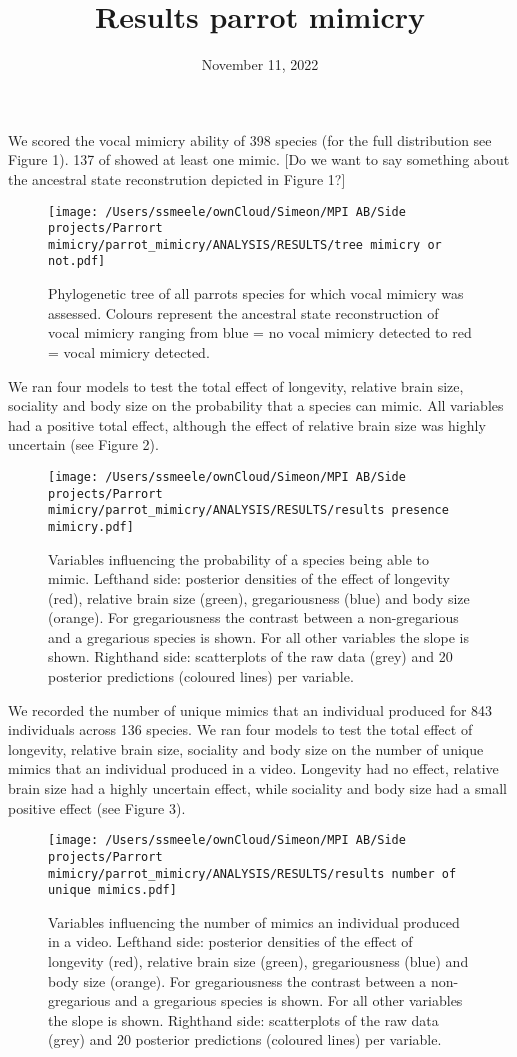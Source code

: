 \documentclass[
  11pt,
]{article}
\title{Results parrot mimicry}
\author{}
\date{\vspace{-2.5em}November 11, 2022}
\begin{document}
\maketitle

We scored the vocal mimicry ability of 398 species (for the full
distribution see Figure 1). 137 of showed at least one mimic. {[}Do we
want to say something about the ancestral state reconstrution depicted
in Figure 1?{]}

\begin{figure}
\centering
\texttt{[image: /Users/ssmeele/ownCloud/Simeon/MPI AB/Side projects/Parrort mimicry/parrot\_mimicry/ANALYSIS/RESULTS/tree mimicry or not.pdf]}
\caption{Phylogenetic tree of all parrots species for which vocal
mimicry was assessed. Colours represent the ancestral state
reconstruction of vocal mimicry ranging from blue = no vocal mimicry
detected to red = vocal mimicry detected.}
\end{figure}

We ran four models to test the total effect of longevity, relative brain
size, sociality and body size on the probability that a species can
mimic. All variables had a positive total effect, although the effect of
relative brain size was highly uncertain (see Figure 2).

\begin{figure}
\centering
\texttt{[image: /Users/ssmeele/ownCloud/Simeon/MPI AB/Side projects/Parrort mimicry/parrot\_mimicry/ANALYSIS/RESULTS/results presence mimicry.pdf]}
\caption{Variables influencing the probability of a species being able
to mimic. Lefthand side: posterior densities of the effect of longevity
(red), relative brain size (green), gregariousness (blue) and body size
(orange). For gregariousness the contrast between a non-gregarious and a
gregarious species is shown. For all other variables the slope is shown.
Righthand side: scatterplots of the raw data (grey) and 20 posterior
predictions (coloured lines) per variable.}
\end{figure}

We recorded the number of unique mimics that an individual produced for
843 individuals across 136 species. We ran four models to test the total
effect of longevity, relative brain size, sociality and body size on the
number of unique mimics that an individual produced in a video.
Longevity had no effect, relative brain size had a highly uncertain
effect, while sociality and body size had a small positive effect (see
Figure 3).

\begin{figure}
\centering
\texttt{[image: /Users/ssmeele/ownCloud/Simeon/MPI AB/Side projects/Parrort mimicry/parrot\_mimicry/ANALYSIS/RESULTS/results number of unique mimics.pdf]}
\caption{Variables influencing the number of mimics an individual
produced in a video. Lefthand side: posterior densities of the effect of
longevity (red), relative brain size (green), gregariousness (blue) and
body size (orange). For gregariousness the contrast between a
non-gregarious and a gregarious species is shown. For all other
variables the slope is shown. Righthand side: scatterplots of the raw
data (grey) and 20 posterior predictions (coloured lines) per variable.}
\end{figure}
\end{document}
